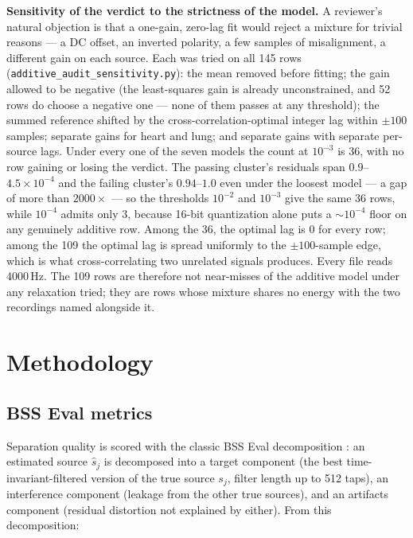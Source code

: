 \documentclass[11pt]{article}
\begin{document}
\textbf{Sensitivity of the verdict to the strictness of the model.} A
reviewer's natural objection is that a one-gain, zero-lag fit would reject a
mixture for trivial reasons --- a DC offset, an inverted polarity, a few
samples of misalignment, a different gain on each source. Each was tried on
all 145 rows (\texttt{additive\_audit\_sensitivity.py}): the mean removed
before fitting; the gain allowed to be negative (the least-squares gain is
already unconstrained, and 52 rows do choose a negative one --- none of
them passes at any threshold); the summed reference shifted by the
cross-correlation-optimal integer lag within $\pm100$ samples; separate
gains for heart and lung; and separate gains with separate per-source lags.
Under every one of the seven models the count at $10^{-3}$ is 36, with no
row gaining or losing the verdict. The passing cluster's residuals span
$0.9$--$4.5\times10^{-4}$ and the failing cluster's $0.94$--$1.0$ even under
the loosest model --- a gap of more than $2000\times$ --- so the thresholds
$10^{-2}$ and $10^{-3}$ give the same 36 rows, while $10^{-4}$ admits only
3, because 16-bit quantization alone puts a $\sim 10^{-4}$ floor on any
genuinely additive row. Among the 36, the optimal lag is 0 for every row;
among the 109 the optimal lag is spread uniformly to the $\pm100$-sample
edge, which is what cross-correlating two unrelated signals produces.
Every file reads 4000\,Hz. The 109 rows are therefore not near-misses of
the additive model under any relaxation tried; they are rows whose
mixture shares no energy with the two recordings named alongside it.

\section{Methodology}
\label{sec:method}

\subsection{BSS Eval metrics}
\label{sec:metrics}

Separation quality is scored with the classic BSS Eval decomposition
\cite{vincent2006}: an estimated source $\hat{s}_j$ is decomposed into a
target component (the best time-invariant-filtered version of the true
source $s_j$, filter length up to 512 taps), an interference component
(leakage from the other true sources), and an artifacts component (residual
distortion not explained by either). From this decomposition:
\end{document}
